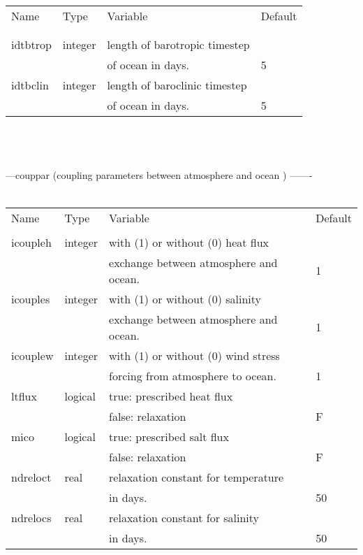 \\
\begin{tabular}{llll}
Name	&    Type  &	Variable			&		Default    \\
\\ 
\hline
\\
idtbtrop&    integer &	length of barotropic timestep           &          \\
        &            &  of ocean in days.	                &      5   \\	
idtbclin&    integer &	length of baroclinic timestep           &          \\
        &            &  of ocean in days.	                &      5   \\  \hline 	
\end{tabular} \\
\\
\\
\newpage
---couppar  (coupling parameters between atmosphere and ocean ) -------\\ \
\\
\begin{tabular}{llll}
Name	&    Type  &	Variable		&		Default    \\
\\ 
\hline
icoupleh&    integer &	with (1) or without (0) heat flux       &         \\
        &            &  exchange between atmosphere and ocean.  &     1   \\
icouples&    integer &	with (1) or without (0) salinity        &         \\
        &            &  exchange between atmosphere and ocean.  &     1   \\	
icouplew&    integer &	with (1) or without (0) wind stress     &         \\
       	&	     &  forcing from atmosphere to ocean.       &     1   \\
ltflux  &    logical &  true:  prescribed heat flux       	&         \\
        &            &  false: relaxation               	&     F   \\	
mico    &    logical &  true:  prescribed salt flux      	&         \\
        &            &  false: relaxation        		&     F   \\	
ndreloct&    real    &	relaxation constant for temperature     &         \\
        &            &  in days.                                &    50   \\
ndrelocs&    real    &	relaxation constant for salinity        &         \\
        &            &  in days.                                &    50   \\  \hline
\end{tabular} \\
